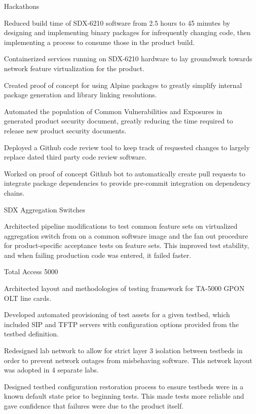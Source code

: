 
\begin{cventries}
  \cventry
    {} {Hackathons} {} {} {
      \begin{cvitems}
      \item {Reduced build time of SDX-6210 software from 2.5 hours to 45 minutes by designing and implementing binary packages for infrequently changing code, then implementing a process to consume those in the product build.}
        \item {Containerized services running on SDX-6210 hardware to lay groundwork towards network feature virtualization for the product.}
        \item {Created proof of concept for using Alpine packages to greatly simplify internal package generation and library linking resolutions.}
        \item {Automated the population of Common Vulnerabilities and Exposures in generated product security document, greatly reducing the time required to release new product security documents.}
        \item {Deployed a Github code review tool to keep track of requested changes to largely replace dated third party code review software.}
        \item {Worked on proof of concept Github bot to automatically create pull requests to integrate package dependencies to provide pre-commit integration on dependency chains.}
      \end{cvitems}
    }

  \cventry
    {} {SDX Aggregation Switches} {} {} {
      \begin{cvitems}
        \item {Architected pipeline modifications to test common feature sets on virtualized aggregation switch from on a common software image and the fan out procedure for product-specific acceptance tests on feature sets. This improved test stability, and when failing production code was entered, it failed faster.}
      \end{cvitems}
    }

  \cventry
    {} {Total Access 5000} {} {} {
      \begin{cvitems}
        \item {Architected layout and methodologies of testing framework for TA-5000 GPON OLT line cards.}
        \item {Developed automated provisioning of test assets for a given testbed, which included SIP and TFTP servers with configuration options provided from the testbed definition.}
        \item {Redesigned lab network to allow for strict layer 3 isolation between testbeds in order to prevent network outages from misbehaving software. This network layout was adopted in 4 separate labs.}
        \item {Designed testbed configuration restoration process to ensure testbeds were in a known default state prior to beginning tests. This made tests more reliable and gave confidence that failures were due to the product itself.}
      \end{cvitems}
    }


\end{cventries}
